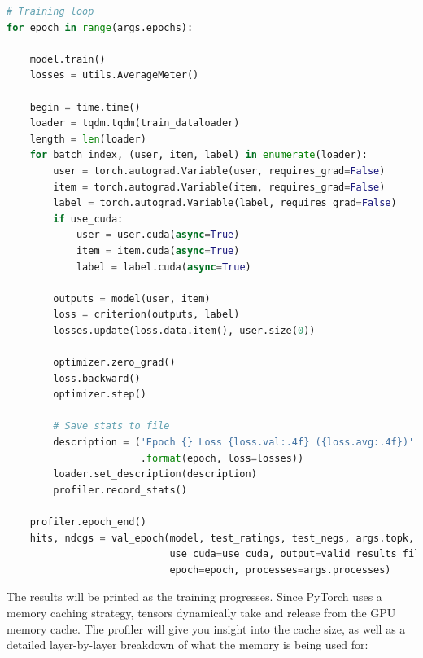 \documentclass[12pt,letterpaper]{article}
\begin{document}
\begin{lstlisting}[language=Python]
# Training loop
for epoch in range(args.epochs):

    model.train()
    losses = utils.AverageMeter()

    begin = time.time()
    loader = tqdm.tqdm(train_dataloader)
    length = len(loader)
    for batch_index, (user, item, label) in enumerate(loader):
        user = torch.autograd.Variable(user, requires_grad=False)
        item = torch.autograd.Variable(item, requires_grad=False)
        label = torch.autograd.Variable(label, requires_grad=False)
        if use_cuda:
            user = user.cuda(async=True)
            item = item.cuda(async=True)
            label = label.cuda(async=True)

        outputs = model(user, item)
        loss = criterion(outputs, label)
        losses.update(loss.data.item(), user.size(0))

        optimizer.zero_grad()
        loss.backward()
        optimizer.step()

        # Save stats to file
        description = ('Epoch {} Loss {loss.val:.4f} ({loss.avg:.4f})'
                       .format(epoch, loss=losses))
        loader.set_description(description)
        profiler.record_stats()

    profiler.epoch_end()
    hits, ndcgs = val_epoch(model, test_ratings, test_negs, args.topk,
                            use_cuda=use_cuda, output=valid_results_file,
                            epoch=epoch, processes=args.processes)
\end{lstlisting}
The results will be printed as the training progresses. Since PyTorch uses a memory caching strategy, tensors dynamically take and release from the GPU memory cache. The profiler will give you insight into the cache size, as well as a detailed layer-by-layer breakdown of what the memory is being used for:
\end{document}
